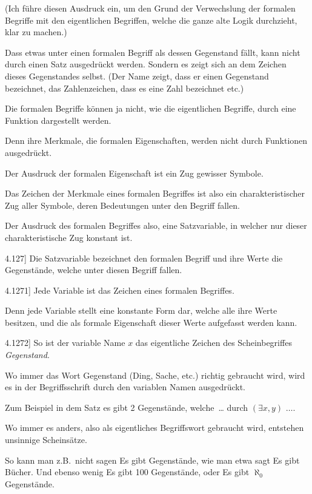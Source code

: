 \documentclass[12pt,oneside]{book}[2007/10/19]
\newcommand{\PropERef}[1]{\hyperref[PropE:#1]{#1}}
\newcommand{\PropositionG}[2]{%
  \item[\phantomsection\label{PropG:#1}\PropERef{#1}] #2%
}
\newcommand{\Emph}[1]{\emph{#1}}%
\newcommand{\zumBeispiel}{z.\;B.}
\begin{document}
\begin{propositions}
{(Ich führe diesen Ausdruck ein, um den Grund
der Verwechslung der formalen Begriffe mit den
eigentlichen Begriffen, welche die ganze alte Logik
durchzieht, klar zu machen.)

Dass etwas unter einen formalen Begriff als
dessen Gegenstand fällt, kann nicht durch einen
Satz ausgedrückt werden. Sondern es zeigt sich
an dem Zeichen dieses Gegenstandes selbst. (Der
Name zeigt, dass er einen Gegenstand bezeichnet,
das Zahlenzeichen, dass es eine Zahl bezeichnet etc.)

Die formalen Begriffe können ja nicht, wie
die eigentlichen Begriffe, durch eine Funktion
dargestellt werden.

Denn ihre Merkmale, die formalen Eigenschaften,
werden nicht durch Funktionen ausgedrückt.

Der Ausdruck der formalen Eigenschaft ist ein
Zug gewisser Symbole.

Das Zeichen der Merkmale eines formalen
Begriffes ist also ein charakteristischer Zug aller
Symbole, deren Bedeutungen unter den Begriff
fallen.

Der Ausdruck des formalen Begriffes also, eine
Satzvariable, in welcher nur dieser charakteristische
Zug konstant ist.}


\PropositionG{4.127}
{Die Satzvariable bezeichnet den formalen
Begriff und ihre Werte die Gegenstände, welche
unter diesen Begriff fallen.}


\PropositionG{4.1271}
{Jede Variable ist das Zeichen eines formalen
Begriffes.

Denn jede Variable stellt eine konstante Form
dar, welche alle ihre Werte besitzen, und die als
\enlargethispage{-4pt} %
formale Eigenschaft dieser Werte aufgefasst werden
kann.}


\PropositionG{4.1272}
{So ist der variable Name \glqq{}$x$\grqq{} das eigentliche
Zeichen des Scheinbegriffes \Emph{Gegenstand}.

Wo immer das Wort \glqq{}Gegenstand\grqq{} (\glqq{}Ding\grqq{},
\glqq{}Sache\grqq{}, etc.) richtig gebraucht wird, wird es in
der Begriffsschrift durch den variablen Namen
ausgedrückt.

Zum Beispiel in dem Satz \glqq{}es gibt 2 Gegenstände,
welche\ \ldots\grqq{} durch \glqq{}$(\exists x, y)$ $\ldots$\grqq{}.

Wo immer es anders, also als eigentliches
Begriffswort gebraucht wird, entstehen unsinnige
Scheinsätze.

So kann man \zumBeispiel\ nicht sagen \glqq{}Es gibt Gegenstände\grqq{},
wie man etwa sagt \glqq{}Es gibt Bücher\grqq{}.
Und ebenso wenig \glqq{}Es gibt 100 Gegenstände\grqq{},
oder \glqq{}Es gibt $\aleph_0$ Gegenstände\grqq{}.

}
\end{propositions}
\end{document}
